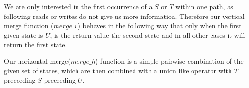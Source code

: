 We are only interested in the first occurrence of a $S$ or $T$ within one path, as following reads or writes do not give us more information. 
Therefore our vertical merge function ($merge\_v$) behaves in the following way that only when the first given state is $U$, is the return value the 
second state and in all other cases it will return the first state.
%


Our horizontal merge($merge\_h$) function is a simple pairwise combination of the given set of states, which are then combined with a union 
like operator with $T$ preceeding $S$ preceeding $U$.
%
%

